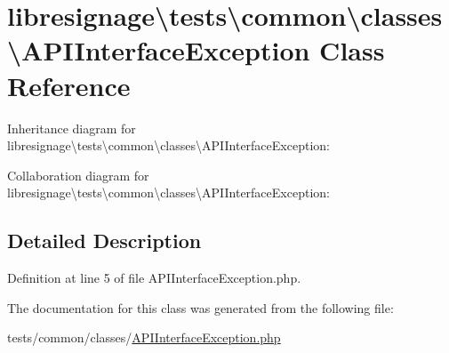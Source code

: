 \hypertarget{classlibresignage_1_1tests_1_1common_1_1classes_1_1APIInterfaceException}{}\section{libresignage\textbackslash{}tests\textbackslash{}common\textbackslash{}classes\textbackslash{}A\+P\+I\+Interface\+Exception Class Reference}
\label{classlibresignage_1_1tests_1_1common_1_1classes_1_1APIInterfaceException}


Inheritance diagram for libresignage\textbackslash{}tests\textbackslash{}common\textbackslash{}classes\textbackslash{}A\+P\+I\+Interface\+Exception\+:


Collaboration diagram for libresignage\textbackslash{}tests\textbackslash{}common\textbackslash{}classes\textbackslash{}A\+P\+I\+Interface\+Exception\+:


\subsection{Detailed Description}


Definition at line 5 of file A\+P\+I\+Interface\+Exception.\+php.



The documentation for this class was generated from the following file\+:\begin{DoxyCompactItemize}
\item 
tests/common/classes/\hyperlink{APIInterfaceException_8php}{A\+P\+I\+Interface\+Exception.\+php}\end{DoxyCompactItemize}
